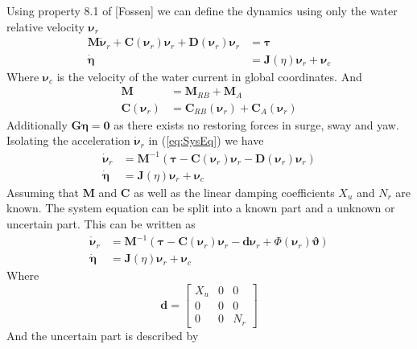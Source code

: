 \documentclass[12pt,a4]{article}
\begin{document}
Using property 8.1 of [Fossen] we can define the dynamics using only the water relative velocity $\bm{\nu}_r$
\begin{align}
	\label{eq:SysEq} \bm{M}\bm{\dot{\nu}}_r + \bm{C}(\bm{\nu}_r)\bm{\nu}_r +\bm{D}(\bm{\nu}_r)\bm{\nu}_r & = \bm{\tau}                           \\
	\bm{\dot{\eta}}                                                                                      & = \bm{J}(\eta)\bm{\nu}_r + \bm{\nu}_c
\end{align}
Where $\bm{\nu}_c$ is the velocity of the water current in global coordinates. And
\begin{align}
	\bm{M}             & = \bm{M}_{RB} + \bm{M}_{A}                         \\
	\bm{C}(\bm{\nu}_r) & = \bm{C}_{RB}(\bm{\nu}_r) + \bm{C}_{A}(\bm{\nu}_r)
\end{align}
Additionally $\bm{G}\bm{\eta} = \bm{0}$ as there exists no restoring forces in surge, sway and yaw.
Isolating the acceleration $\bm{\dot{\nu}}_r$ in (\ref{eq:SysEq}) we have
\begin{align}
	\bm{\dot{\nu}}_r & = \bm{M}^{-1} (\bm{\tau} -\bm{C}(\bm{\nu}_r)\bm{\nu}_r -\bm{D}(\bm{\nu}_r)\bm{\nu}_r ) \\
	\bm{\dot{\eta}}  & = \bm{J}(\eta)\bm{\nu}_r + \bm{\nu}_c
\end{align}
Assuming that $\bm{M}$ and $\bm{C}$ as well as the linear damping coefficients $X_u$ and $N_r$ are known. The system equation can be split into a known part and a unknown or uncertain part. This can be written as
\begin{align}
	\bm{\dot{\nu}}_r & = \bm{M}^{-1} (\bm{\tau} -\bm{C}(\bm{\nu}_r)\bm{\nu}_r - \bm{d} \bm{\nu}_r + \Phi(\bm{\nu}_r )\bm{\vartheta}) \\
	\bm{\dot{\eta}}  & = \bm{J}(\eta)\bm{\nu}_r + \bm{\nu}_c
\end{align}
Where
\begin{equation}
	\bm{d} = \begin{bmatrix}
		X_u & 0 & 0   \\
		0   & 0 & 0   \\
		0   & 0 & N_r
	\end{bmatrix}
\end{equation}
And the uncertain part is described by
\end{document}
